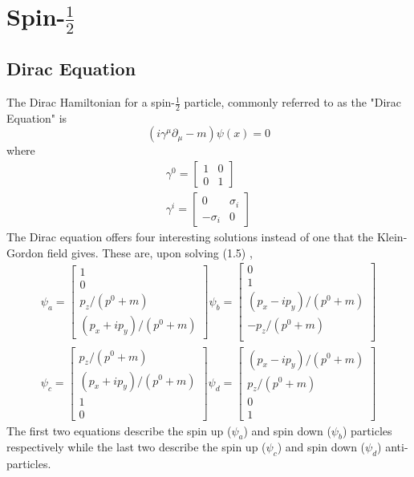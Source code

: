 \section{Spin-$ \frac{1}{2}$}
\subsection{Dirac Equation}
The Dirac Hamiltonian for a spin-$ \frac{1}{2} $ particle, commonly referred to as the "Dirac Equation" is \cite{lahiri04}
\begin{equation}
(i\gamma^{\mu}\partial_\mu-m)\psi(x)=0
\end{equation}
where
\begin{eqnarray}
\gamma^0=\begin{bmatrix}
1 & 0\\
0 & 1
\end{bmatrix}\\
\gamma^i=\begin{bmatrix}
0 &  \sigma_i\\
-\sigma_i & 0
\end{bmatrix}
\end{eqnarray}
The Dirac equation offers four interesting solutions instead of one that the Klein-Gordon field gives. These are, upon solving (1.5) \cite{griffiths08},
\begin{eqnarray}
\psi_a=\begin{bmatrix}
1\\
0\\
p_z/(p^0+m)\\
(p_x+ip_y)/(p^0+m)
\end{bmatrix}
\psi_b=\begin{bmatrix}
0\\
1\\
(p_x-ip_y)/(p^0+m)\\
-p_z/(p^0+m)\\
\end{bmatrix}\\
\psi_c=\begin{bmatrix}
p_z/(p^0+m)\\
(p_x+ip_y)/(p^0+m)\\
1\\
0
\end{bmatrix}
\psi_d=\begin{bmatrix}
(p_x-ip_y)/(p^0+m)\\
p_z/(p^0+m)\\
0\\
1
\end{bmatrix}
\end{eqnarray}
The first two equations describe the spin up ($\psi_a$) and spin down ($\psi_b$) particles respectively while the last two describe the spin up ($\psi_c$) and spin down ($\psi_d$) anti-particles.
